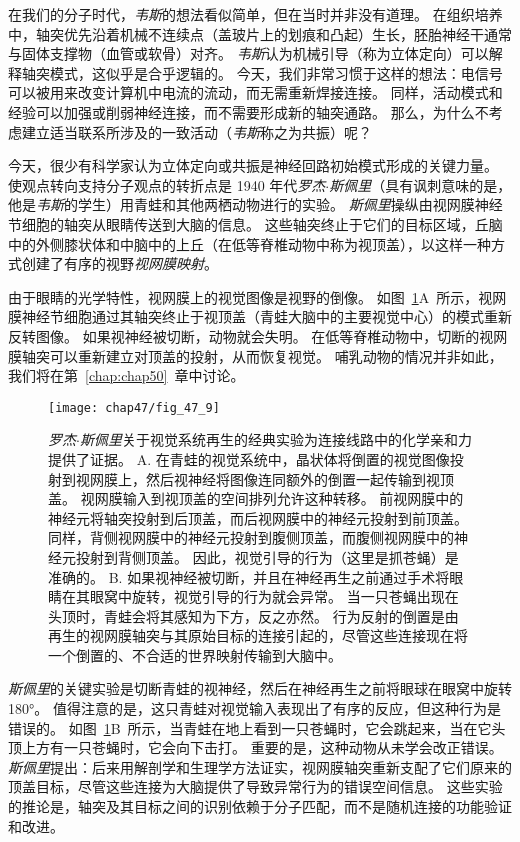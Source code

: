在我们的分子时代，\textit{韦斯}的想法看似简单，但在当时并非没有道理。
在组织培养中，轴突优先沿着机械不连续点（盖玻片上的划痕和凸起）生长，胚胎神经干通常与固体支撑物（血管或软骨）对齐。
\textit{韦斯}认为机械引导（称为立体定向）可以解释轴突模式，这似乎是合乎逻辑的。
今天，我们非常习惯于这样的想法：电信号可以被用来改变计算机中电流的流动，而无需重新焊接连接。
同样，活动模式和经验可以加强或削弱神经连接，而不需要形成新的轴突通路。
那么，为什么不考虑建立适当联系所涉及的一致活动（\textit{韦斯}称之为共振）呢？


今天，很少有科学家认为立体定向或共振是神经回路初始模式形成的关键力量。
使观点转向支持分子观点的转折点是 1940 年代\textit{罗杰$\cdot$斯佩里}（具有讽刺意味的是，他是\textit{韦斯}的学生）用青蛙和其他两栖动物进行的实验。
\textit{斯佩里}操纵由视网膜神经节细胞的轴突从眼睛传送到大脑的信息。
这些轴突终止于它们的目标区域，丘脑中的外侧膝状体和中脑中的上丘（在低等脊椎动物中称为视顶盖），以这样一种方式创建了有序的视野\textit{视网膜映射}。


由于眼睛的光学特性，视网膜上的视觉图像是视野的倒像。
如图~\ref{fig:47_9}A~所示，视网膜神经节细胞通过其轴突终止于视顶盖（青蛙大脑中的主要视觉中心）的模式重新反转图像。
如果视神经被切断，动物就会失明。
在低等脊椎动物中，切断的视网膜轴突可以重新建立对顶盖的投射，从而恢复视觉。
哺乳动物的情况并非如此，我们将在第~\ref{chap:chap50}~章中讨论。


\begin{figure}[htbp]
	\centering
	\texttt{[image: chap47/fig\_47\_9]}
	\caption{\textit{罗杰$\cdot$斯佩里}关于视觉系统再生的经典实验为连接线路中的化学亲和力提供了证据。
		A. 在青蛙的视觉系统中，晶状体将倒置的视觉图像投射到视网膜上，然后视神经将图像连同额外的倒置一起传输到视顶盖。
		视网膜输入到视顶盖的空间排列允许这种转移。
		前视网膜中的神经元将轴突投射到后顶盖，而后视网膜中的神经元投射到前顶盖。
		同样，背侧视网膜中的神经元投射到腹侧顶盖，而腹侧视网膜中的神经元投射到背侧顶盖。
		因此，视觉引导的行为（这里是抓苍蝇）是准确的。
		B. 如果视神经被切断，并且在神经再生之前通过手术将眼睛在其眼窝中旋转，视觉引导的行为就会异常。
		当一只苍蝇出现在头顶时，青蛙会将其感知为下方，反之亦然。
		行为反射的倒置是由再生的视网膜轴突与其原始目标的连接引起的，尽管这些连接现在将一个倒置的、不合适的世界映射传输到大脑中。}
	\label{fig:47_9}
\end{figure}


\textit{斯佩里}的关键实验是切断青蛙的视神经，然后在神经再生之前将眼球在眼窝中旋转 180°。
值得注意的是，这只青蛙对视觉输入表现出了有序的反应，但这种行为是错误的。
如图~\ref{fig:47_9}B~所示，当青蛙在地上看到一只苍蝇时，它会跳起来，当在它头顶上方有一只苍蝇时，它会向下击打。
重要的是，这种动物从未学会改正错误。
\textit{斯佩里}提出：后来用解剖学和生理学方法证实，视网膜轴突重新支配了它们原来的顶盖目标，尽管这些连接为大脑提供了导致异常行为的错误空间信息。
这些实验的推论是，轴突及其目标之间的识别依赖于分子匹配，而不是随机连接的功能验证和改进。


